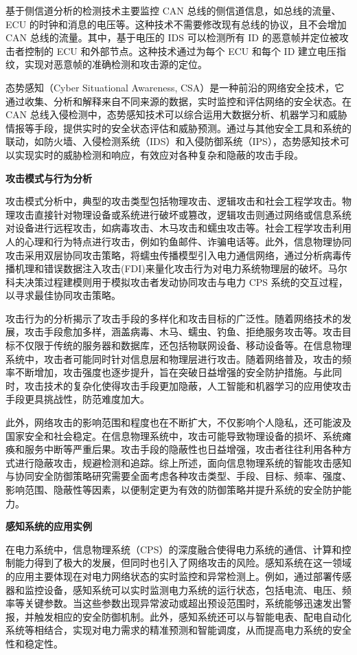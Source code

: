 基于侧信道分析的检测技术主要监控 CAN 总线的侧信道信息，如总线的流量、ECU 的时钟和消息的电压等。这种技术不需要修改现有总线的协议，且不会增加 CAN 总线的流量。其中，基于电压的 IDS 可以检测所有 ID 的恶意帧并定位被攻击者控制的 ECU 和外部节点。这种技术通过为每个 ECU 和每个 ID 建立电压指纹，实现对恶意帧的准确检测和攻击源的定位。

态势感知（Cyber Situational Awareness, CSA）是一种前沿的网络安全技术，它通过收集、分析和解释来自不同来源的数据，实时监控和评估网络的安全状态。在 CAN 总线入侵检测中，态势感知技术可以综合运用大数据分析、机器学习和威胁情报等手段，提供实时的安全状态评估和威胁预测。通过与其他安全工具和系统的联动，如防火墙、入侵检测系统（IDS）和入侵防御系统（IPS），态势感知技术可以实现实时的威胁检测和响应，有效应对各种复杂和隐蔽的攻击手段。

\textbf{攻击模式与行为分析}

攻击模式分析中，典型的攻击类型包括物理攻击、逻辑攻击和社会工程学攻击。物理攻击直接针对物理设备或系统进行破坏或篡改，逻辑攻击则通过网络或信息系统对设备进行远程攻击，如病毒攻击、木马攻击和蠕虫攻击等。社会工程学攻击利用人的心理和行为特点进行攻击，例如钓鱼邮件、诈骗电话等。此外，信息物理协同攻击采用双层协同攻击策略，将蠕虫传播模型引入电力通信网络，通过分析病毒传播机理和错误数据注入攻击(FDI)来量化攻击行为对电力系统物理层的破坏。马尔科夫决策过程建模则用于模拟攻击者发动协同攻击与电力 CPS 系统的交互过程，以寻求最佳协同攻击策略。

攻击行为的分析揭示了攻击手段的多样化和攻击目标的广泛性。随着网络技术的发展，攻击手段愈加多样，涵盖病毒、木马、蠕虫、钓鱼、拒绝服务攻击等。攻击目标不仅限于传统的服务器和数据库，还包括物联网设备、移动设备等。在信息物理系统中，攻击者可能同时针对信息层和物理层进行攻击。随着网络普及，攻击的频率不断增加，攻击强度也逐步提升，旨在突破日益增强的安全防护措施。与此同时，攻击技术的复杂化使得攻击手段更加隐蔽，人工智能和机器学习的应用使攻击手段更具挑战性，防范难度加大。

此外，网络攻击的影响范围和程度也在不断扩大，不仅影响个人隐私，还可能波及国家安全和社会稳定。在信息物理系统中，攻击可能导致物理设备的损坏、系统瘫痪和服务中断等严重后果。攻击手段的隐蔽性也日益增强，攻击者往往利用各种方式进行隐蔽攻击，规避检测和追踪。综上所述，面向信息物理系统的智能攻击感知与协同安全防御策略研究需要全面考虑各种攻击类型、手段、目标、频率、强度、影响范围、隐蔽性等因素，以便制定更为有效的防御策略并提升系统的安全防护能力。

\textbf{感知系统的应用实例}

在电力系统中，信息物理系统（CPS）的深度融合使得电力系统的通信、计算和控制能力得到了极大的发展，但同时也引入了网络攻击的风险。感知系统在这一领域的应用主要体现在对电力网络状态的实时监控和异常检测上。例如，通过部署传感器和监控设备，感知系统可以实时监测电力系统的运行状态，包括电流、电压、频率等关键参数。当这些参数出现异常波动或超出预设范围时，系统能够迅速发出警报，并触发相应的安全防御机制。此外，感知系统还可以与智能电表、配电自动化系统等相结合，实现对电力需求的精准预测和智能调度，从而提高电力系统的安全性和稳定性。

